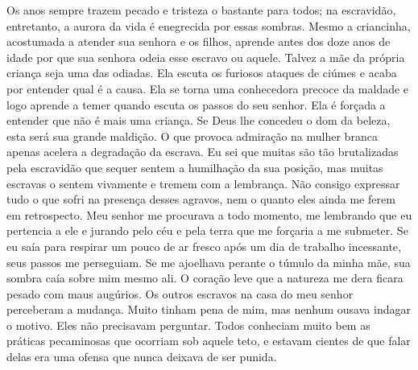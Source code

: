 Os anos sempre trazem pecado e tristeza
o bastante para todos; na escravidão, entretanto, a aurora da vida é
enegrecida por essas sombras. Mesmo a criancinha, acostumada a atender
sua senhora e os filhos, aprende antes dos doze anos de idade por que
sua senhora odeia esse escravo ou aquele. Talvez a mãe da própria
criança seja uma das odiadas. Ela escuta os furiosos ataques de ciúmes e
acaba por entender qual é a causa. Ela se torna uma conhecedora precoce
da maldade e logo aprende a temer quando escuta os passos do seu senhor.
Ela é forçada a entender que não é mais uma criança. Se Deus lhe
concedeu o dom da beleza, esta será sua grande maldição. O que provoca
admiração na mulher branca apenas acelera a degradação da escrava. Eu
sei que muitas são tão brutalizadas pela escravidão que sequer sentem a
humilhação da sua posição, mas muitas escravas o sentem vivamente e
tremem com a lembrança. Não consigo expressar tudo o que sofri na
presença desses agravos, nem o quanto eles ainda me ferem em
retrospecto. Meu senhor me procurava a todo momento, me lembrando que eu
pertencia a ele e jurando pelo céu e pela terra que me forçaria a me
submeter. Se eu saía para respirar um pouco de ar fresco após um dia de
trabalho incessante, seus passos me perseguiam. Se me ajoelhava perante
o túmulo da minha mãe, sua sombra caía sobre mim mesmo ali. O coração
leve que a natureza me dera ficara pesado com maus augúrios. Os outros
escravos na casa do meu senhor perceberam a mudança. Muito tinham pena
de mim, mas nenhum ousava indagar o motivo. Eles não precisavam
perguntar. Todos conheciam muito bem as práticas pecaminosas que
ocorriam sob aquele teto, e estavam cientes de que falar delas era uma
ofensa que nunca deixava de ser punida.

